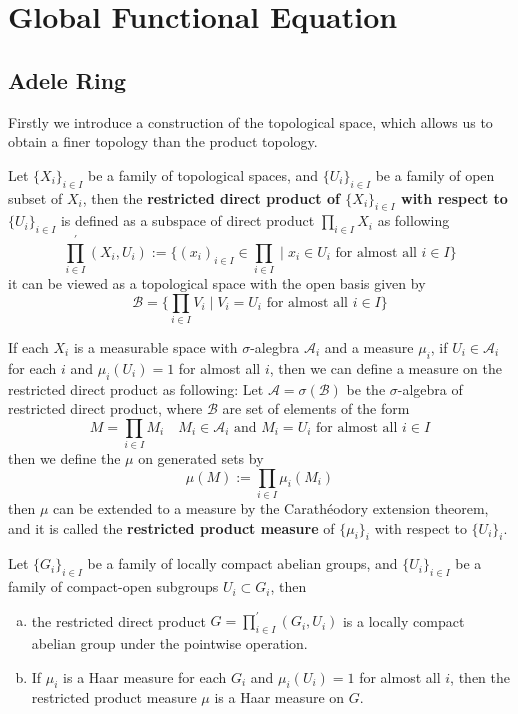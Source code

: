 \section{Global Functional Equation}

\subsection{Adele Ring}

Firstly we introduce a construction of the topological space, which allows us to obtain a finer topology than the product topology.

\begin{definition}
    Let \(\{X_i\}_{i \in I}\) be a family of topological spaces, and \(\{U_i\}_{i \in I}\) be a family of open subset of \(X_i\), then the \textbf{restricted direct product of \(\{X_i\}_{i \in I}\) with respect to \(\{U_i\}_{i \in I }\)} is defined as a subspace of direct product \(\prod_{i \in I}X_i\) as following
    \[\prod_{i \in I}^{\prime}(X_i, U_i) := \{(x_i)_{i \in I} \in \prod_{i \in I} \mid x_i \in U_i \text{ for almost all } i \in I\}\]
    it can be viewed as a topological space with the open basis given by 
    \[\mathcal{B} = \{\prod_{i \in I}V_i \mid V_i = U_i \text{ for almost all } i \in I\}\]
\end{definition}

If each \(X_i\) is a measurable space with \(\sigma\)-alegbra \(\mathcal{A}_i\) and a measure \(\mu_i\), if \(U_i \in \mathcal{A}_i\) for each \(i\) and \(\mu_i(U_i) = 1\) for almost all \(i\), then we can define a measure on the restricted direct product as following: Let \(\mathcal{A} = \sigma(\mathcal{B})\) be the \(\sigma\)-algebra of restricted direct product, where \(\mathcal{B}\) are set of elements of the form
\[M = \prod_{i \in I}M_i \quad M_i \in \mathcal{A}_i \text{ and } M_i = U_i \text{ for almost all } i \in I\]
then we define the \(\mu\) on generated sets by
\[\mu(M) := \prod_{i \in I} \mu_i(M_i)\]
then \(\mu\) can be extended to a measure by the Carathéodory extension theorem, and it is called the \textbf{restricted product measure} of \(\{\mu_i\}_i\) with respect to \(\{U_i\}_i\).

\begin{lemma} \label{restrictedproduct} 
    Let \(\{G_i\}_{i \in I}\) be a family of locally compact abelian groups, and \(\{U_i\}_{i \in I}\) be a family of compact-open subgroups \(U_i \subset G_i\), then 
    \begin{enumerate} [(a)]
        \item the restricted direct product \(G = \prod_{i \in I}^{\prime}(G_i, U_i)\) is a locally compact abelian group under the pointwise operation.
        \item If \(\mu_i\) is a Haar measure for each \(G_i\) and \(\mu_i(U_i) = 1\) for almost all \(i\), then the restricted product measure \(\mu\) is a Haar measure on \(G\).
    \end{enumerate}
\end{lemma}

